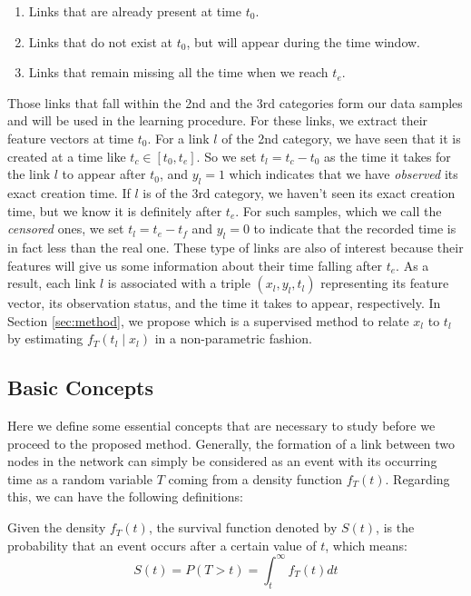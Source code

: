 \begin{enumerate}
\item Links that are already present at time $t_0$.
\item Links that do not exist at $t_0$, but will appear during the time window.
\item Links that remain missing all the time when we reach $t_e$.
\end{enumerate}

Those links that fall within the 2nd and the 3rd categories form our data samples and will be used in the learning procedure. For these links, we extract their feature vectors at time $t_0$. For a link $l$ of the 2nd category, we have seen that it is created at a time like $t_c\in[t_0,t_e]$. So we set $t_l=t_c-t_0$ as the time it takes for the link $l$ to appear after $t_0$, and $y_l=1$ which indicates that we have \emph{observed} its exact creation time. If $l$ is of the 3rd category, we haven't seen its exact creation time, but we know it is definitely after $t_e$. For such samples, which we call the \emph{censored} ones, we set $t_l=t_e-t_f$ and $y_l=0$ to indicate that the recorded time is in fact less than the real one. These type of links are also of interest because their features will give us some information about their time falling after $t_e$. As a result, each link $l$ is associated with a triple $(x_l,y_l,t_l)$ representing its feature vector, its observation status, and the time it takes to appear, respectively. In Section \ref{sec:method}, we propose \npglm which is a supervised method to relate $x_l$ to $t_l$ by estimating $f_T(t_l\mid x_l)$ in a non-parametric fashion.

\subsection{Basic Concepts}
Here we define some essential concepts that are necessary to study before we proceed to the proposed method. Generally, the formation of a link between two nodes in the network can simply be considered as an event with its occurring time as a random variable $T$ coming from a density function $f_T(t)$. Regarding this, we can have the following definitions:

\begin{definition}
Given the density $f_T(t)$, the survival function denoted by $S(t)$, is the probability that an event occurs after a certain value of $t$, which means:
\begin{equation}
    S(t) = P(T > t) = \int_t^\infty f_T(t)dt
\end{equation}
\end{definition}

